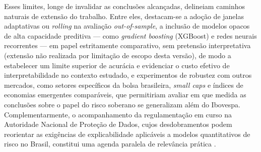 \documentclass[	12pt, Times, openright, oneside, a4paper, english, brazil]{abntex2}
\begin{document}
Esses limites, longe de invalidar as conclusões alcançadas, delineiam caminhos naturais de extensão do trabalho. Entre eles, destacam-se a adoção de janelas adaptativas ou \textit{rolling} na avaliação \textit{out-of-sample}, a inclusão de modelos opacos de alta capacidade preditiva — como \textit{gradient boosting} (XGBoost) e redes neurais recorrentes — em papel estritamente comparativo, sem pretensão interpretativa (extensão não realizada por limitação de escopo desta versão), de modo a estabelecer um limite superior de acurácia e evidenciar o custo efetivo de interpretabilidade no contexto estudado, e experimentos de robustez com outros mercados, como setores específicos da bolsa brasileira, \textit{small caps} e índices de economias emergentes comparáveis, que permitiriam avaliar em que medida as conclusões sobre o papel do risco soberano se generalizam além do Ibovespa. Complementarmente, o acompanhamento da regulamentação em curso na Autoridade Nacional de Proteção de Dados, cujos desdobramentos podem reorientar as exigências de explicabilidade aplicáveis a modelos quantitativos de risco no Brasil, constitui uma agenda paralela de relevância prática \cite{anpd2025nt12}.

\postextual


%


%
%


\end{document}

